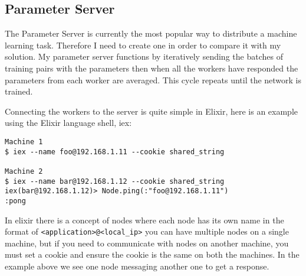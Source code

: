 \subsection{Parameter Server}
The Parameter Server is currently the most popular way to distribute a machine
learning task. Therefore I need to create one in order to compare it with my
solution. My parameter server functions by iteratively sending the batches of
training pairs with the parameters then when all the workers have responded the
parameters from each worker are averaged. This cycle repeats until the network
is trained.

Connecting the workers to the server is quite simple in Elixir, here is an
example using the Elixir language shell, iex:
\begin{lstlisting}[basicstyle=\linespread{0.8}\ttfamily\footnotesize,numbers=none]
Machine 1
$ iex --name foo@192.168.1.11 --cookie shared_string

Machine 2
$ iex --name bar@192.168.1.12 --cookie shared_string
iex(bar@192.168.1.12)> Node.ping(:"foo@192.168.1.11")
:pong
\end{lstlisting}

In elixir there is a concept of nodes where each node has its own name in the
format of \lstinline{<application>@<local_ip>} you can have multiple nodes on a
single machine, but if you need to communicate with nodes on another machine,
you must set a cookie and ensure the cookie is the same on both the machines. In
the example above we see one node messaging another one to get a response.

